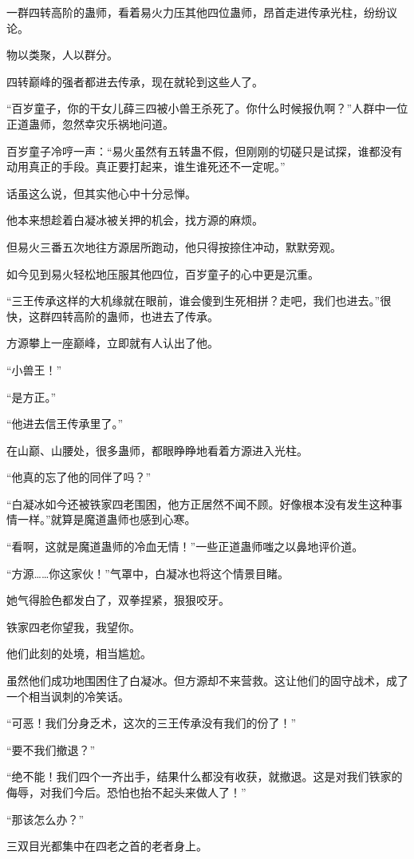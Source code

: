 \begin{this_body}
一群四转高阶的蛊师，看着易火力压其他四位蛊师，昂首走进传承光柱，纷纷议论。

物以类聚，人以群分。

四转巅峰的强者都进去传承，现在就轮到这些人了。

“百岁童子，你的干女儿薛三四被小兽王杀死了。你什么时候报仇啊？”人群中一位正道蛊师，忽然幸灾乐祸地问道。

百岁童子冷哼一声：“易火虽然有五转蛊不假，但刚刚的切磋只是试探，谁都没有动用真正的手段。真正要打起来，谁生谁死还不一定呢。”

话虽这么说，但其实他心中十分忌惮。

他本来想趁着白凝冰被关押的机会，找方源的麻烦。

但易火三番五次地往方源居所跑动，他只得按捺住冲动，默默旁观。

如今见到易火轻松地压服其他四位，百岁童子的心中更是沉重。

“三王传承这样的大机缘就在眼前，谁会傻到生死相拼？走吧，我们也进去。”很快，这群四转高阶的蛊师，也进去了传承。

方源攀上一座巅峰，立即就有人认出了他。

“小兽王！”

“是方正。”

“他进去信王传承里了。”

在山巅、山腰处，很多蛊师，都眼睁睁地看着方源进入光柱。

“他真的忘了他的同伴了吗？”

“白凝冰如今还被铁家四老围困，他方正居然不闻不顾。好像根本没有发生这种事情一样。”就算是魔道蛊师也感到心寒。

“看啊，这就是魔道蛊师的冷血无情！”一些正道蛊师嗤之以鼻地评价道。

“方源……你这家伙！”气罩中，白凝冰也将这个情景目睹。

她气得脸色都发白了，双拳捏紧，狠狠咬牙。

铁家四老你望我，我望你。

他们此刻的处境，相当尴尬。

虽然他们成功地围困住了白凝冰。但方源却不来营救。这让他们的固守战术，成了一个相当讽刺的冷笑话。

“可恶！我们分身乏术，这次的三王传承没有我们的份了！”

“要不我们撤退？”

“绝不能！我们四个一齐出手，结果什么都没有收获，就撤退。这是对我们铁家的侮辱，对我们今后。恐怕也抬不起头来做人了！”

“那该怎么办？”

三双目光都集中在四老之首的老者身上。


\end{this_body}
